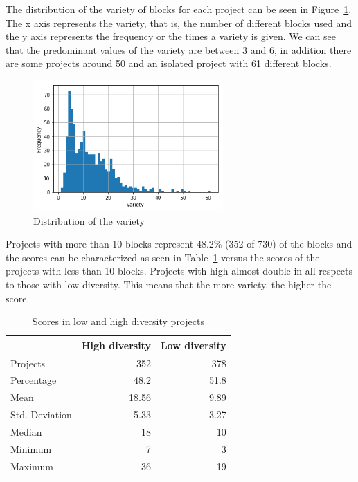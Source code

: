 \documentclass[a4paper]{article}
\begin{document}
The distribution of the variety of blocks for each project can be seen in Figure~\ref{fig:var-dist}. The x axis represents the variety, that is, the number of different blocks used and the y axis represents the frequency or the times a variety is given. We can see that the predominant values of the variety are between 3 and 6, in addition there are some projects around 50 and an isolated project with 61 different blocks. 

\begin{figure}
\begin{center}
\includegraphics[height=5cm]{fig1}
\caption{Distribution of the variety}
\label{fig:var-dist}
\end{center}
\end{figure}

Projects with more than 10 blocks represent 48.2\% (352 of 730) of the blocks and the scores can be characterized as seen in Table~\ref{tab:comparison} versus the scores of the projects with less than 10 blocks. Projects with high almost double in all respects to those with low diversity. This means that the more variety, the higher the score.

\begin{table}
\begin{center}
\caption{Scores in low and high diversity projects}

\bigskip
\label{tab:comparison}

\begin{tabular}{|l|r|r|}
\hline
& High diversity & Low diversity \\ \hline
Projects & 352 & 378\\ \hline
Percentage & 48.2 & 51.8\\ \hline
Mean & 18.56 & 9.89\\ \hline
Std. Deviation & 5.33 & 3.27\\ \hline
Median & 18 & 10\\ \hline
Minimum & 7 & 3\\ \hline
Maximum & 36 & 19\\ \hline
\end{tabular}
\end{center}
\end{table}
\end{document}
